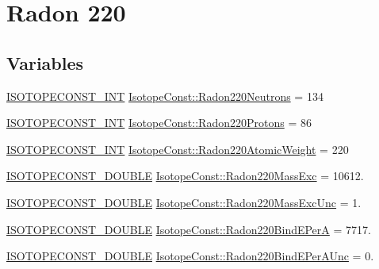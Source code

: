 \hypertarget{group___isotope_const-_radon-_rn220}{}\section{Radon 220}
\label{group___isotope_const-_radon-_rn220}
\subsection*{Variables}
\begin{DoxyCompactItemize}
\item 
\mbox{\hyperlink{group___isotope_const-_macros_ga5f18360b3e99483a35c32d789e62621c}{I\+S\+O\+T\+O\+P\+E\+C\+O\+N\+S\+T\+\_\+\+I\+NT}} \mbox{\hyperlink{group___isotope_const-_radon-_rn220_ga23a5246308e427d0a6d4884c1f071cdb}{Isotope\+Const\+::\+Radon220\+Neutrons}} = 134
\item 
\mbox{\hyperlink{group___isotope_const-_macros_ga5f18360b3e99483a35c32d789e62621c}{I\+S\+O\+T\+O\+P\+E\+C\+O\+N\+S\+T\+\_\+\+I\+NT}} \mbox{\hyperlink{group___isotope_const-_radon-_rn220_ga3ec19a2cfbd19966136ccb25ae9a53d2}{Isotope\+Const\+::\+Radon220\+Protons}} = 86
\item 
\mbox{\hyperlink{group___isotope_const-_macros_ga5f18360b3e99483a35c32d789e62621c}{I\+S\+O\+T\+O\+P\+E\+C\+O\+N\+S\+T\+\_\+\+I\+NT}} \mbox{\hyperlink{group___isotope_const-_radon-_rn220_ga73c3c5903616fac8aa27eb7c1c957014}{Isotope\+Const\+::\+Radon220\+Atomic\+Weight}} = 220
\item 
\mbox{\hyperlink{group___isotope_const-_macros_ga8f45a7272ce02c0b4c65c44636ed719a}{I\+S\+O\+T\+O\+P\+E\+C\+O\+N\+S\+T\+\_\+\+D\+O\+U\+B\+LE}} \mbox{\hyperlink{group___isotope_const-_radon-_rn220_ga30ced21c95e2e41a390aa908af9b74c2}{Isotope\+Const\+::\+Radon220\+Mass\+Exc}} = 10612.
\item 
\mbox{\hyperlink{group___isotope_const-_macros_ga8f45a7272ce02c0b4c65c44636ed719a}{I\+S\+O\+T\+O\+P\+E\+C\+O\+N\+S\+T\+\_\+\+D\+O\+U\+B\+LE}} \mbox{\hyperlink{group___isotope_const-_radon-_rn220_ga9e39cad1a3b294e2f3379f9ca5d0e7ea}{Isotope\+Const\+::\+Radon220\+Mass\+Exc\+Unc}} = 1.
\item 
\mbox{\hyperlink{group___isotope_const-_macros_ga8f45a7272ce02c0b4c65c44636ed719a}{I\+S\+O\+T\+O\+P\+E\+C\+O\+N\+S\+T\+\_\+\+D\+O\+U\+B\+LE}} \mbox{\hyperlink{group___isotope_const-_radon-_rn220_ga349847769aebe58780b11d72389623d8}{Isotope\+Const\+::\+Radon220\+Bind\+E\+PerA}} = 7717.
\item 
\mbox{\hyperlink{group___isotope_const-_macros_ga8f45a7272ce02c0b4c65c44636ed719a}{I\+S\+O\+T\+O\+P\+E\+C\+O\+N\+S\+T\+\_\+\+D\+O\+U\+B\+LE}} \mbox{\hyperlink{group___isotope_const-_radon-_rn220_ga964f45f2c21ea4b165eaab1e4d8087c6}{Isotope\+Const\+::\+Radon220\+Bind\+E\+Per\+A\+Unc}} = 0.

\end{DoxyCompactItemize}
